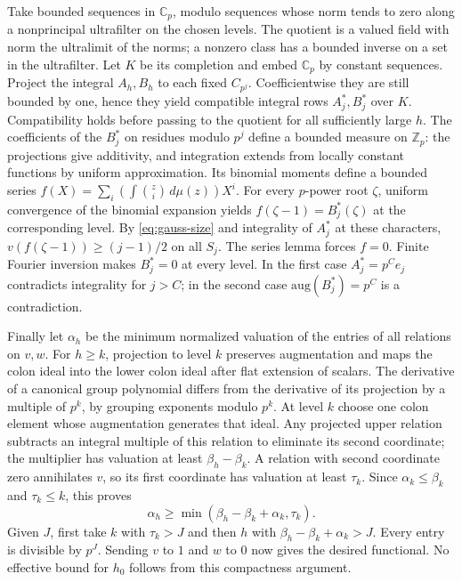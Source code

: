 \documentclass[11pt]{article}
\begin{document}
Take bounded sequences in $\mathbb C_p$, modulo sequences whose norm
tends to zero along a nonprincipal ultrafilter on the chosen levels.
The quotient is a valued field with norm the ultralimit of the norms;
a nonzero class has a bounded inverse on a set in the ultrafilter.
Let $K$ be its completion and embed $\mathbb C_p$ by constant sequences.
Project the integral $A_h,B_h$ to each fixed $C_{p^j}$. Coefficientwise
they are still bounded by one, hence they yield compatible integral
rows $A_j^*,B_j^*$ over $K$. Compatibility holds before passing
to the quotient for all sufficiently large $h$. The coefficients of
the $B_j^*$ on residues modulo $p^j$ define a bounded measure on
$\mathbb Z_p$: the projections give additivity, and integration extends
from locally constant functions by uniform approximation. Its binomial
moments define a bounded series
$f(X)=\sum_i(\int\binom zi\,d\mu(z))X^i$.
For every $p$-power root $\zeta$, uniform convergence of the binomial
expansion yields $f(\zeta-1)=B_j^*(\zeta)$ at the corresponding level.
By \eqref{eq:gauss-size} and integrality of $A_j^*$ at these characters,
$v(f(\zeta-1))\ge(j-1)/2$ on all $S_j$. The series lemma forces
$f=0$. Finite Fourier inversion makes $B_j^*=0$ at every level.
In the first case $A_j^*=p^C e_j$ contradicts integrality for $j>C$;
in the second case $\mathrm{aug}(B_j^*)=p^C$ is a contradiction.

Finally let $\alpha_h$ be the minimum normalized valuation of the
entries of all relations on $v,w$. For $h\ge k$, projection to level
$k$ preserves augmentation and maps the colon ideal into the lower
colon ideal after flat extension of scalars. The derivative of
a canonical group polynomial differs from the derivative of its
projection by a multiple of $p^k$, by grouping exponents modulo $p^k$.
At level $k$ choose one colon element whose augmentation generates that
ideal. Any projected upper relation subtracts an integral multiple of
this relation to eliminate its second coordinate; the multiplier has
valuation at least $\beta_h-\beta_k$. A relation with second coordinate
zero annihilates $v$, so its first coordinate has valuation at least
$\tau_k$. Since $\alpha_k\le\beta_k$ and $\tau_k\le k$, this proves
\[
 \alpha_h\ge\min(\beta_h-\beta_k+\alpha_k,\tau_k).
\]
Given $J$, first take $k$ with $\tau_k>J$ and then $h$ with
$\beta_h-\beta_k+\alpha_k>J$. Every entry is divisible by $p^J$.
Sending $v$ to $1$ and $w$ to $0$ now gives the desired functional.
No effective bound for $h_0$ follows from this compactness argument.
\end{document}
